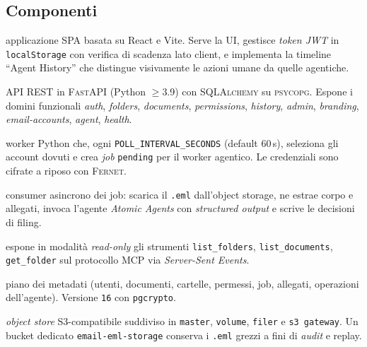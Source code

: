 \documentclass[11pt,a4paper,oneside]{article}
\begin{document}
\subsection{Componenti}
\begin{description}[leftmargin=*]
    \item[Frontend (\texttt{frontend/})] applicazione \textsc{SPA} basata su
          React e Vite. Serve la UI, gestisce \emph{token JWT} in
          \texttt{localStorage} con verifica di scadenza lato client, e implementa
          la timeline ``Agent History'' che distingue visivamente le azioni
          umane da quelle agentiche.
    \item[Backend (\texttt{backend/})] API REST in \textsc{FastAPI} (Python
          $\geq$3.9) con \textsc{SQLAlchemy} su \textsc{psycopg}. Espone i
          domini funzionali \emph{auth}, \emph{folders}, \emph{documents},
          \emph{permissions}, \emph{history}, \emph{admin}, \emph{branding},
          \emph{email-accounts}, \emph{agent}, \emph{health}.
    \item[Email Poller (\texttt{email\_poller/})] worker Python che, ogni
          \texttt{POLL\_INTERVAL\_SECONDS} (default $60$\,s), seleziona gli
          account dovuti e crea \emph{job} \texttt{pending} per il worker
          agentico. Le credenziali sono cifrate a riposo con \textsc{Fernet}.
    \item[Agent Worker (\texttt{agent\_worker/})] consumer asincrono dei job:
          scarica il \texttt{.eml} dall'object storage, ne estrae corpo e
          allegati, invoca l'agente \emph{Atomic Agents} con \emph{structured
          output} e scrive le decisioni di filing.
    \item[MCP Server (\texttt{mcp\_server/})] espone in modalit\`a \emph{read-only}
          gli strumenti \texttt{list\_folders}, \texttt{list\_documents},
          \texttt{get\_folder} sul protocollo MCP via \emph{Server-Sent Events}.
    \item[PostgreSQL] piano dei metadati (utenti, documenti, cartelle,
          permessi, job, allegati, operazioni dell'agente). Versione
          \texttt{16} con \texttt{pgcrypto}.
    \item[SeaweedFS] \emph{object store} S3-compatibile suddiviso in
          \texttt{master}, \texttt{volume}, \texttt{filer} e \texttt{s3 gateway}.
          Un bucket dedicato \texttt{email-eml-storage} conserva i \texttt{.eml}
          grezzi a fini di \emph{audit} e replay.
\end{description}
\end{document}

